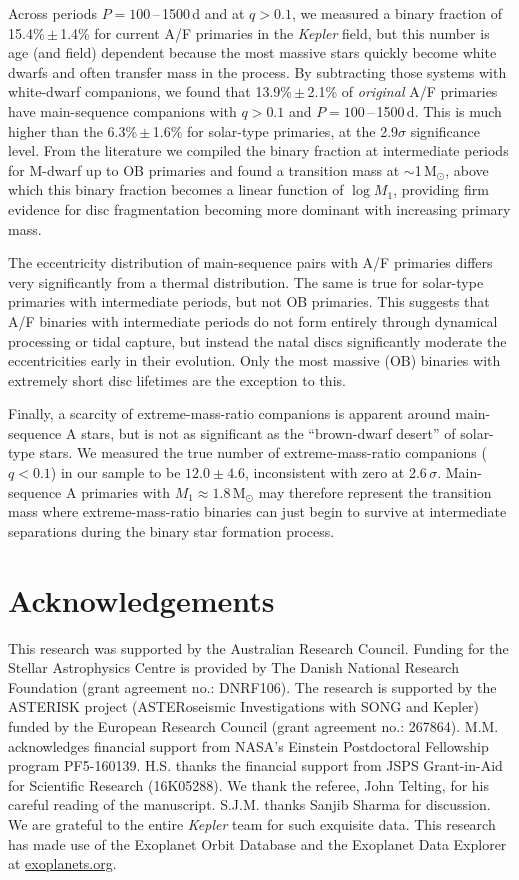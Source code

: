 \documentclass[a4paper,fleqn,usenatbib]{mnras}
\begin{document}
Across periods $P=100$\,--\,1500\,d and at $q>0.1$, we measured a binary fraction of 15.4\%\,$\pm$\,1.4\% for current A/F primaries in the \textit{Kepler} field, but this number is age (and field) dependent because the most massive stars quickly become white dwarfs and often transfer mass in the process. By subtracting those systems with white-dwarf companions, we found that \mbox{13.9\%\,$\pm$\,2.1\%} of {\it original} A/F primaries have main-sequence companions with $q>0.1$ and $P=100$\,--\,1500\,d. This is much higher than the 6.3\%\,$\pm$\,1.6\% for solar-type primaries, at the 2.9$\sigma$ significance level. From the literature we compiled the binary fraction at intermediate periods for M-dwarf up to OB primaries and found a transition mass at $\sim$1\,M$_{\odot}$, above which this binary fraction becomes a linear function of $\log M_1$, providing firm evidence for disc fragmentation becoming more dominant with increasing primary mass.

The eccentricity distribution of main-sequence pairs with A/F primaries differs very significantly from a thermal distribution. The same is true for solar-type primaries with intermediate periods, but not OB primaries. This suggests that A/F binaries with intermediate periods do not form entirely through dynamical processing or tidal capture, but instead the natal discs significantly moderate the eccentricities early in their evolution. Only the most massive (OB) binaries with extremely short disc lifetimes are the exception to this.

Finally, a scarcity of extreme-mass-ratio companions is apparent around main-sequence A stars, but is not as significant as the ``brown-dwarf desert'' of solar-type stars. We measured the true number of extreme-mass-ratio companions ($q<0.1$) in our sample to be $12.0\pm4.6$, inconsistent with zero at 2.6\,$\sigma$. Main-sequence A primaries with $M_1 \approx 1.8$\,M$_{\odot}$ may therefore represent the transition mass where extreme-mass-ratio binaries can just begin to survive at intermediate separations during the binary star formation process. 





\section*{Acknowledgements}
This research was supported by the Australian Research Council. Funding for the Stellar Astrophysics Centre is provided by The Danish National Research Foundation (grant agreement no.: DNRF106). The research is supported by the ASTERISK project (ASTERoseismic Investigations with SONG and Kepler) funded by the European Research Council (grant agreement no.: 267864). M.M. acknowledges financial support from NASA's Einstein Postdoctoral Fellowship program PF5-160139. H.S. thanks the financial support from JSPS Grant-in-Aid for Scientific Research (16K05288). We thank the referee, John Telting, for his careful reading of the manuscript. S.J.M. thanks Sanjib Sharma for discussion. We are grateful to the entire \textit{Kepler} team for such exquisite data. This research has made use of the Exoplanet Orbit Database and the Exoplanet Data Explorer at \url{exoplanets.org}.
\end{document}
